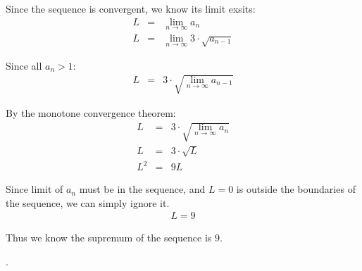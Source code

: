 \documentclass{myassignment}
\begin{document}
\begin{answer}
		Since the sequence is convergent, we know its limit exsits:
		\begin{eqnarray}
			L &=& \lim_{n\rightarrow\infty} a_n\\[1em]
			L &=& \lim_{n\rightarrow\infty} 3\cdot\sqrt{a_{n-1}}
		\end{eqnarray}

		Since all $a_n > 1$:\\
		\begin{eqnarray}
			L &=& 3\cdot\sqrt{ \lim_{n\rightarrow\infty} a_{n-1} }
		\end{eqnarray}

		By the monotone convergence theorem:
		\begin{eqnarray}
			L &=& 3\cdot\sqrt{ \lim_{n\rightarrow\infty} a_{n} }\\[1em]
			L &=& 3\cdot\sqrt{L}\\[1em]
			L^2 &=& 9L
		\end{eqnarray}

		Since limit of $a_{n}$ must be in the sequence, and $L=0$ is outside the boundaries of the sequence, we can simply ignore it.
		\begin{eqnarray}
			L = 9
		\end{eqnarray}

		Thus we know the supremum of the sequence is $9$.
	\end{answer}.
\end{document}
